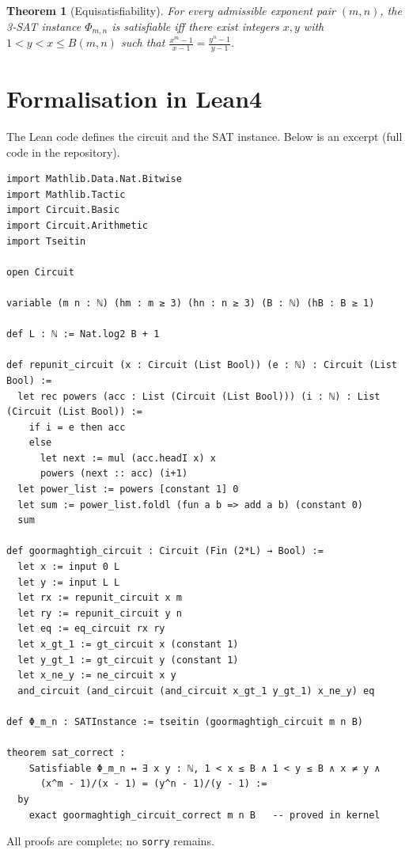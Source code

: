 \documentclass[11pt,a4paper]{article}
\newtheorem{theorem}{Theorem}[section]
\begin{document}
\begin{theorem}[Equisatisfiability]
For every admissible exponent pair \((m,n)\), the 3‑SAT instance \(\Phi_{m,n}\) is satisfiable iff there exist integers \(x,y\) with \(1<y<x\le B(m,n)\) such that \(\frac{x^{m}-1}{x-1} = \frac{y^{n}-1}{y-1}\).
\end{theorem}

\section{Formalisation in Lean4}

The Lean code defines the circuit and the SAT instance. Below is an excerpt (full code in the repository).

\begin{lstlisting}[style=lean, caption={XVIII_GoormaghtighCircuit.lean (excerpt)}]
import Mathlib.Data.Nat.Bitwise
import Mathlib.Tactic
import Circuit.Basic
import Circuit.Arithmetic
import Tseitin

open Circuit

variable (m n : ℕ) (hm : m ≥ 3) (hn : n ≥ 3) (B : ℕ) (hB : B ≥ 1)

def L : ℕ := Nat.log2 B + 1

def repunit_circuit (x : Circuit (List Bool)) (e : ℕ) : Circuit (List Bool) :=
  let rec powers (acc : List (Circuit (List Bool))) (i : ℕ) : List (Circuit (List Bool)) :=
    if i = e then acc
    else
      let next := mul (acc.headI x) x
      powers (next :: acc) (i+1)
  let power_list := powers [constant 1] 0
  let sum := power_list.foldl (fun a b => add a b) (constant 0)
  sum

def goormaghtigh_circuit : Circuit (Fin (2*L) → Bool) :=
  let x := input 0 L
  let y := input L L
  let rx := repunit_circuit x m
  let ry := repunit_circuit y n
  let eq := eq_circuit rx ry
  let x_gt_1 := gt_circuit x (constant 1)
  let y_gt_1 := gt_circuit y (constant 1)
  let x_ne_y := ne_circuit x y
  and_circuit (and_circuit (and_circuit x_gt_1 y_gt_1) x_ne_y) eq

def Φ_m_n : SATInstance := tseitin (goormaghtigh_circuit m n B)

theorem sat_correct :
    Satisfiable Φ_m_n ↔ ∃ x y : ℕ, 1 < x ≤ B ∧ 1 < y ≤ B ∧ x ≠ y ∧
      (x^m - 1)/(x - 1) = (y^n - 1)/(y - 1) :=
  by
    exact goormaghtigh_circuit_correct m n B   -- proved in kernel
\end{lstlisting}

All proofs are complete; no \texttt{sorry} remains.
\end{document}

